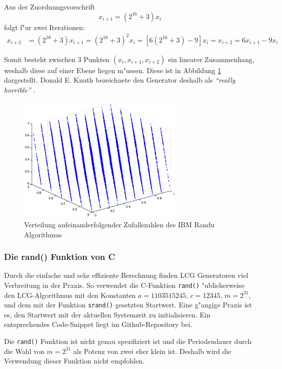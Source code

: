 \begin{refsection}
Aus der Zuordnungsvorschrift
\begin{equation*}
	x_{i+1} = (2^{16} + 3) x_i
\end{equation*}
folgt f"ur zwei Iterationen:
\begin{align*}
	x_{i+2} &= (2^{16} + 3) x_{i+1} = (2^{16} + 3)^2 x_i = [6 (2^{16} + 3) - 9] x_i = x_{i+2} = 6 x_{i+1} - 9 x_i
\end{align*}

Somit besteht zwischen 3 Punkten $(x_i, x_{i+1},x_{i+2})$ ein linearer
Zusammenhang, weshalb diese auf einer Ebene liegen m"ussen. Diese
ist in Abbildung \ref{fig:IBMRandu} dargestellt. Donald E. Knuth
bezeichnete den Generator deshalb als \textit{``really horrible''}
\cite[p.173]{rng:KnuthVol2}.

\begin{figure}[htbp]
	\centering
	\includegraphics[width=8cm]{montecarlo/images/ibm_randu.eps}
	\caption{Verteilung aufeinanderfolgender Zufallszahlen des IBM Randu Algorithmus}
	\label{fig:IBMRandu}
\end{figure}

\subsubsection{Die rand() Funktion von C}
Durch die einfache und sehr effiziente Berechnung finden LCG
Generatoren viel Verbreitung in der Praxis. So verwendet die C-Funktion
\texttt{rand()} "ublicherweise den LCG-Algorithmus mit den Konstanten
$a=1103515245$, $c=12345$, $m=2^{31}$, und dem mit der Funktion
\texttt{srand()} gesetzten Startwert. \cite{rng:randFunction} Eine
g"angige Praxis ist es, den Startwert mit der aktuellen Systemzeit zu
initialisieren. Ein entsprechendes Code-Snippet liegt im Github-Repository
bei. \cite{rng:githubRepo}

Die \texttt{rand()} Funktion ist nicht genau spezifiziert ist und die
Periodendauer durch die Wahl von $m=2^{31}$ als Potenz von zwei eher
klein ist. Deshalb wird die Verwendung dieser Funktion nicht empfohlen.


\end{refsection}
